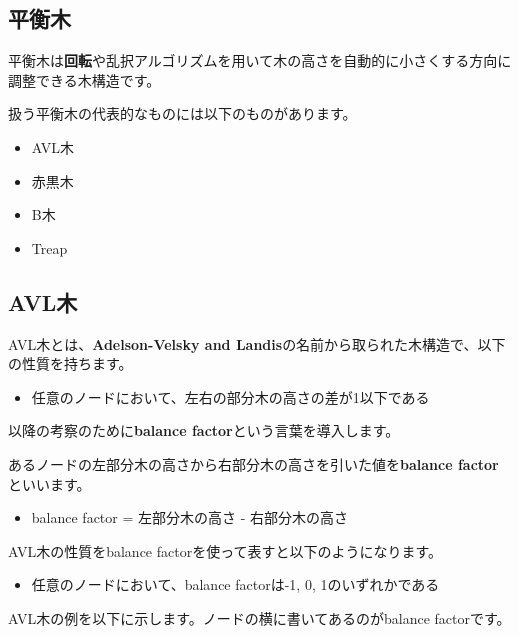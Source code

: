 \vspace{0.5cm}

\subsection{平衡木}
平衡木は\textbf{回転}や乱択アルゴリズムを用いて木の高さを自動的に小さくする方向に調整できる木構造です。

扱う平衡木の代表的なものには以下のものがあります。

\begin{itemize}
  \item AVL木
  \item 赤黒木
  \item B木
  \item Treap
\end{itemize}

\subsection{AVL木}
AVL木とは、\textbf{Adelson-Velsky and Landis}の名前から取られた木構造で、以下の性質を持ちます。

\begin{itemize}
  \item 任意のノードにおいて、左右の部分木の高さの差が1以下である
\end{itemize}

\vspace{0.5cm}

以降の考察のために\textbf{balance factor}という言葉を導入します。

\begin{definitionbox}
  あるノードの左部分木の高さから右部分木の高さを引いた値を\textbf{balance factor}といいます。
  \begin{itemize}
    \item balance factor = 左部分木の高さ - 右部分木の高さ
  \end{itemize}
\end{definitionbox}

AVL木の性質をbalance factorを使って表すと以下のようになります。

\begin{itemize}
  \item 任意のノードにおいて、balance factorは-1, 0, 1のいずれかである
\end{itemize}

AVL木の例を以下に示します。ノードの横に書いてあるのがbalance factorです。

